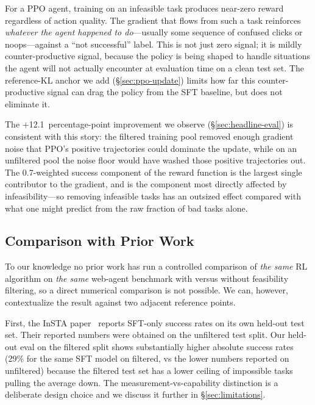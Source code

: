 \documentclass[12pt,a4paper]{report}
\begin{document}
For a PPO agent, training on an infeasible task produces near-zero reward regardless of action quality. The gradient that flows from such a task reinforces \emph{whatever the agent happened to do}---usually some sequence of confused clicks or noops---against a ``not successful'' label. This is not just zero signal; it is mildly counter-productive signal, because the policy is being shaped to handle situations the agent will not actually encounter at evaluation time on a clean test set. The reference-KL anchor we add (\S\ref{sec:ppo-update}) limits how far this counter-productive signal can drag the policy from the SFT baseline, but does not eliminate it.

The +12.1~percentage-point improvement we observe (\S\ref{sec:headline-eval}) is consistent with this story: the filtered training pool removed enough gradient noise that PPO's positive trajectories could dominate the update, while on an unfiltered pool the noise floor would have washed those positive trajectories out. The 0.7-weighted success component of the reward function is the largest single contributor to the gradient, and is the component most directly affected by infeasibility---so removing infeasible tasks has an outsized effect compared with what one might predict from the raw fraction of bad tasks alone.

\subsection{Comparison with Prior Work}

To our knowledge no prior work has run a controlled comparison of \emph{the same} RL algorithm on \emph{the same} web-agent benchmark with versus without feasibility filtering, so a direct numerical comparison is not possible. We can, however, contextualize the result against two adjacent reference points.

First, the InSTA paper~\cite{trabucco2025insta} reports SFT-only success rates on its own held-out test set. Their reported numbers were obtained on the unfiltered test split. Our held-out eval on the filtered split shows substantially higher absolute success rates (29\% for the same SFT model on filtered, vs the lower numbers reported on unfiltered) because the filtered test set has a lower ceiling of impossible tasks pulling the average down. The measurement-vs-capability distinction is a deliberate design choice and we discuss it further in \S\ref{sec:limitations}.
\end{document}

